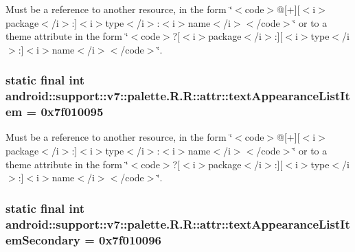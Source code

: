 Must be a reference to another resource, in the form \char`\"{}$<$code$>$@\mbox{[}+\mbox{]}\mbox{[}$<$i$>$package$<$/i$>$:\mbox{]}$<$i$>$type$<$/i$>$:$<$i$>$name$<$/i$>$$<$/code$>$\char`\"{} or to a theme attribute in the form \char`\"{}$<$code$>$?\mbox{[}$<$i$>$package$<$/i$>$:\mbox{]}\mbox{[}$<$i$>$type$<$/i$>$:\mbox{]}$<$i$>$name$<$/i$>$$<$/code$>$\char`\"{}. \hypertarget{classandroid_1_1support_1_1v7_1_1palette_1_1_r_1_1attr_0b3aabd11375a340071efe2d336d0a43}{
\subsubsection[{textAppearanceListItem}]{\setlength{\rightskip}{0pt plus 5cm}static final int android::support::v7::palette.R.R::attr::textAppearanceListItem = 0x7f010095}}
\label{classandroid_1_1support_1_1v7_1_1palette_1_1_r_1_1attr_0b3aabd11375a340071efe2d336d0a43}


Must be a reference to another resource, in the form \char`\"{}$<$code$>$@\mbox{[}+\mbox{]}\mbox{[}$<$i$>$package$<$/i$>$:\mbox{]}$<$i$>$type$<$/i$>$:$<$i$>$name$<$/i$>$$<$/code$>$\char`\"{} or to a theme attribute in the form \char`\"{}$<$code$>$?\mbox{[}$<$i$>$package$<$/i$>$:\mbox{]}\mbox{[}$<$i$>$type$<$/i$>$:\mbox{]}$<$i$>$name$<$/i$>$$<$/code$>$\char`\"{}. \hypertarget{classandroid_1_1support_1_1v7_1_1palette_1_1_r_1_1attr_cfe2dab401b54526a39a8cc52291af4c}{
\subsubsection[{textAppearanceListItemSecondary}]{\setlength{\rightskip}{0pt plus 5cm}static final int android::support::v7::palette.R.R::attr::textAppearanceListItemSecondary = 0x7f010096}}
\label{classandroid_1_1support_1_1v7_1_1palette_1_1_r_1_1attr_cfe2dab401b54526a39a8cc52291af4c}


